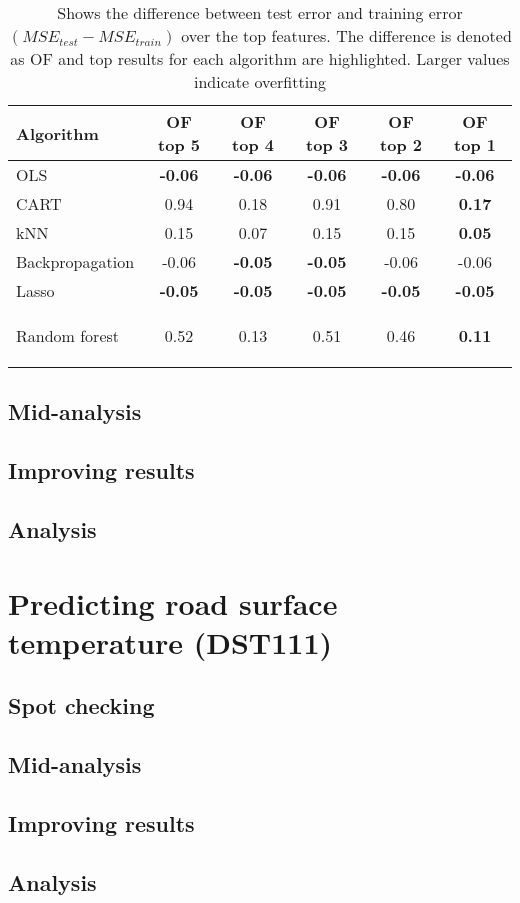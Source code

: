 	\begin{table}[H]
		\centering
		\caption{Shows the difference between test error and training error $(MSE_{test} - MSE_{train})$ over the top features. The difference is denoted as 			OF and top results for each algorithm are highlighted. Larger values indicate overfitting}
		\begin{tabular}[6]{l |c | c | c | c |c }
    			Algorithm & OF top 5 & OF top 4 & OF top 3 & OF top 2 & OF top 1 \\
			\hline
			OLS 			& \textbf{-0.06} & \textbf{-0.06} & \textbf{-0.06} & \textbf{-0.06} & \textbf{-0.06} \\ \hline
			CART 		& 0.94 & 0.18 & 0.91 & 0.80 & \textbf{0.17} \\ \hline
			kNN 			& 0.15 & 0.07 & 0.15 & 0.15 & \textbf{0.05} \\ \hline
			Backpropagation & -0.06 & \textbf{-0.05} & \textbf{-0.05} & -0.06 & -0.06 \\ \hline
			Lasso 		& \textbf{-0.05} & \textbf{-0.05} & \textbf{-0.05} & \textbf{-0.05} & \textbf{-0.05} \\ \hline
			Random forest 	& 0.52 & 0.13 & 0.51 & 0.46 & \textbf{0.11}
 
			\label{table:spotcheck_tirs_of}
		\end{tabular}
		
	\end{table}

	\subsection{Mid-analysis}
	\subsection{Improving results}
	\subsection{Analysis}



\section{Predicting road surface temperature (DST111)}
	\subsection{Spot checking}
	\subsection{Mid-analysis}
	\subsection{Improving results}
	\subsection{Analysis}



